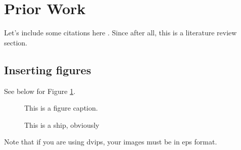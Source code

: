 % 


\section{Prior Work}
\label{priorwork}



Let's include some citations here \cite{Schenker:06} \cite{Schenker:35}.  Since after all, this is a literature review section.\cite{Bent:87}

\subsection{Inserting figures}

See below for Figure \ref{testfigure1}.

\begin{figure}[!ht]
\begin{center}
\vspace{.15in}
\caption{\footnotesize This is a figure caption.}
\label{testfigure1}
\end{center}
\end{figure}

\begin{figure}[!ht]
\begin{center}
\vspace{.15in}
\caption{\footnotesize This is a ship, obviously}
\label{testfigure2}
\end{center}
\end{figure}

Note that if you are using dvips, your images must be in eps format.

